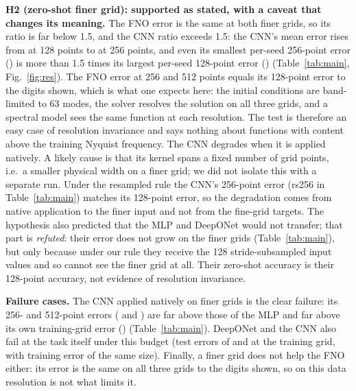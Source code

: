 \textbf{H2 (zero-shot finer grid): supported as stated, with a caveat that changes its meaning.} The FNO error is the same at both finer grids, so its ratio is far below 1.5, and the CNN ratio exceeds 1.5: the CNN's mean error rises from  at 128 points to  at 256 points, and even its smallest per-seed 256-point error () is more than 1.5 times its largest per-seed 128-point error () (Table~\ref{tab:main}, Fig.~\ref{fig:res}). The FNO error at 256 and 512 points equals its 128-point error to the digits shown, which is what one expects here: the initial conditions are band-limited to 63 modes, the solver resolves the solution on all three grids, and a spectral model sees the same function at each resolution. The test is therefore an easy case of resolution invariance and says nothing about functions with content above the training Nyquist frequency. The CNN degrades when it is applied natively. A likely cause is that its kernel spans a fixed number of grid points, i.e.\ a smaller physical width on a finer grid; we did not isolate this with a separate run. Under the resampled rule the CNN's 256-point error (rs256 in Table~\ref{tab:main}) matches its 128-point error, so the degradation comes from native application to the finer input and not from the fine-grid targets. The hypothesis also predicted that the MLP and DeepONet would not transfer; that part is \emph{refuted}: their error does not grow on the finer grids (Table~\ref{tab:main}), but only because under our rule they receive the 128 stride-subsampled input values and so cannot see the finer grid at all. Their zero-shot accuracy is their 128-point accuracy, not evidence of resolution invariance.

\textbf{Failure cases.} The CNN applied natively on finer grids is the clear failure: its 256- and 512-point errors ( and ) are far above those of the MLP and far above its own training-grid error () (Table~\ref{tab:main}). DeepONet and the CNN also fail at the task itself under this budget (test errors of  and  at the training grid, with training error of the same size). Finally, a finer grid does not help the FNO either: its error is the same on all three grids to the digits shown, so on this data resolution is not what limits it.
